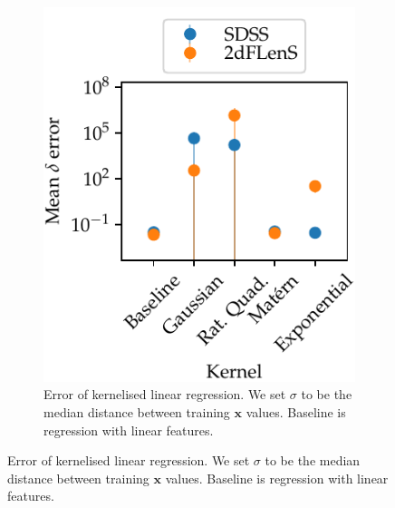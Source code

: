 \documentclass[11pt,twoside,openright]{report}
\newcommand\bx{\mathbf{x}}
\begin{document}
\begin{figure}
\begin{subfigure}{0.4\textwidth}
    \includegraphics[width=\textwidth]{linreg_kernelised.pdf}
    \caption{Error of kernelised linear regression. We set $\sigma$ to be the median distance between training $\bx$ values. Baseline is regression with linear features.}
    \label{fig:linreg_kernelised}
  \end{subfigure}


\end{figure}
\end{document}
